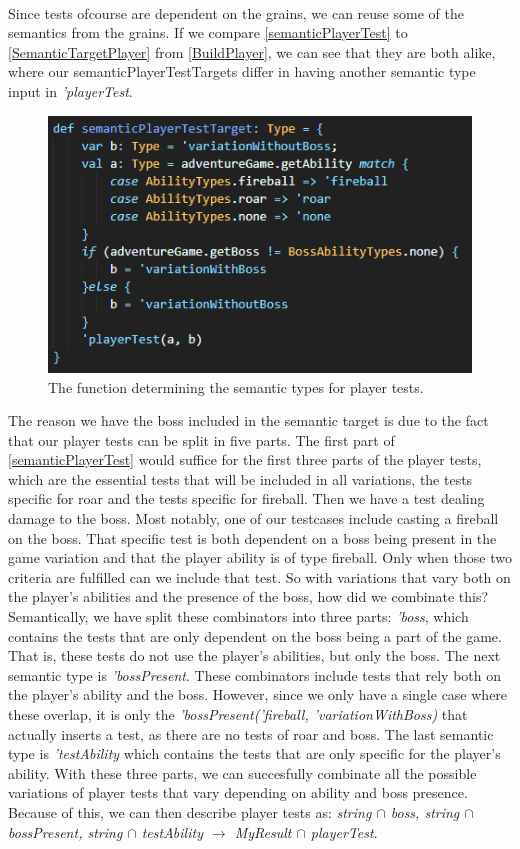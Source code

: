 \\
Since tests ofcourse are dependent on the grains, we can reuse some of the semantics from the grains. If we compare \autoref{semanticPlayerTest} to \autoref{SemanticTargetPlayer} from \autoref{BuildPlayer}, we can see that they are both alike, where our semanticPlayerTestTargets differ in having another semantic type input in \textit{'playerTest}. 
\begin{figure}[h]
    \centering
    \includegraphics[width=0.7\linewidth]{Materials/TestingDiscussion/SemanticPlayerTestTarget}
    \caption{The function determining the semantic types for player tests.}
    \label{semanticPlayerTest}
\end{figure}
The reason we have the boss included in the semantic target is due to the fact that our player tests can be split in five parts. The first part of \autoref{semanticPlayerTest} would suffice for the first three parts of the player tests, which are the essential tests that will be included in all variations, the tests specific for roar and the tests specific for fireball. Then we have a test dealing damage to the boss. Most notably, one of our testcases include casting a fireball on the boss. That specific test is both dependent on a boss being present in the game variation and that the player ability is of type fireball. Only when those two criteria are fulfilled can we include that test. So with variations that vary both on the player's abilities and the presence of the boss, how did we combinate this? \\
Semantically, we have split these combinators into three parts: \textit{'boss}, which contains the tests that are only dependent on the boss being a part of the game. That is, these tests do not use the player's abilities, but only the boss. The next semantic type is \textit{'bossPresent}. These combinators include tests that rely both on the player's ability and the boss. However, since we only have a single case where these overlap, it is only the \textit{'bossPresent('fireball, 'variationWithBoss)} that actually inserts a test, as there are no tests of roar and boss. The last semantic type is \textit{'testAbility} which contains the tests that are only specific for the player's ability. With these three parts, we can succesfully combinate all the possible variations of player tests that vary depending on ability and boss presence. Because of this, we can then describe player tests as: \textit{string $\cap$ boss, string $\cap$ bossPresent, string $\cap$ testAbility $\to$ MyResult $\cap$ playerTest}. \\
